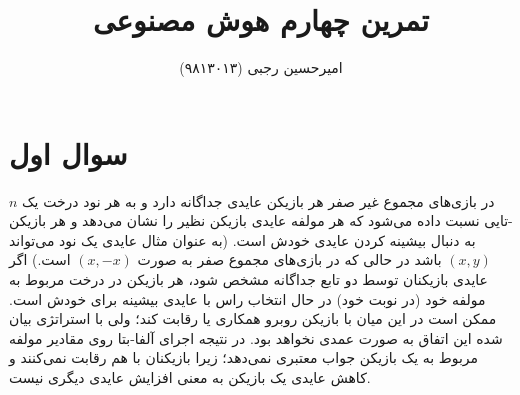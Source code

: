 \documentclass{article}
\title{
	تمرین چهارم هوش مصنوعی
}
\author{
	امیرحسین رجبی (۹۸۱۳۰۱۳)
}
\begin{document}
	\maketitle
	
	\section*{
	سوال اول
	}
	در بازی‌های مجموع غیر صفر هر بازیکن عایدی
	جداگانه دارد و به هر نود درخت یک $n$-تایی نسبت داده می‌شود که هر مولفه عایدی بازیکن نظیر را نشان می‌دهد و هر بازیکن به دنبال بیشینه کردن عایدی خودش است. (به عنوان مثال عایدی یک نود می‌تواند 
	$(x, y)$
	باشد در حالی که در بازی‌های مجموع صفر به صورت
	$(x, -x)$
	است.) اگر عایدی بازیکنان توسط دو تابع جداگانه مشخص شود، هر بازیکن در درخت مربوط به مولفه خود (در نوبت خود) در حال انتخاب راس با عایدی بیشینه برای خودش است. ممکن است در این میان با بازیکن روبرو همکاری یا رقابت کند؛ ولی با استراتژی بیان شده این اتفاق به صورت عمدی نخواهد بود. در نتیجه اجرای آلفا-بتا روی مقادیر مولفه مربوط به یک بازیکن جواب معتبری نمی‌دهد؛ زیرا بازیکنان با هم رقابت نمی‌کنند و کاهش عایدی یک بازیکن به معنی افزایش عایدی دیگری نیست.
	
\end{document}
